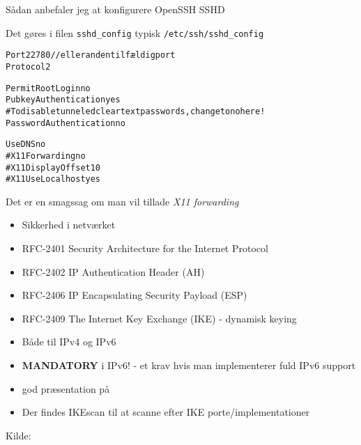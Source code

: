 \documentclass[Screen16to9,17pt]{foils}
\begin{document}

\begin{list1}
\item Sådan anbefaler jeg at konfigurere OpenSSH SSHD
\item Det gøres i filen \verb+sshd_config+ typisk \verb+/etc/ssh/sshd_config+
\end{list1}

\begin{alltt}\small
Port 22780    // eller anden tilfældig port
Protocol 2

PermitRootLogin no
PubkeyAuthentication yes
# To disable tunneled clear text passwords, change to no here!
PasswordAuthentication no

UseDNS no
#X11Forwarding no
#X11DisplayOffset 10
#X11UseLocalhost yes
\end{alltt}

Det er en smagssag om man vil tillade \emph{X11 forwarding}







\begin{itemize}
\item Sikkerhed i netværket
\item RFC-2401 Security Architecture for the Internet Protocol
\item RFC-2402 IP Authentication Header (AH)
\item RFC-2406 IP Encapsulating Security Payload (ESP)
\item RFC-2409 The Internet Key Exchange (IKE) - dynamisk keying
\item Både til IPv4 og IPv6
\item {\bfseries MANDATORY} i IPv6! - et krav hvis man implementerer
  fuld IPv6 support
\item god præsentation på 
\item Der findes IKEscan til at scanne efter IKE
  porte/implementationer\\
\end{itemize}


\centerline{Kilde: }


\end{document}
